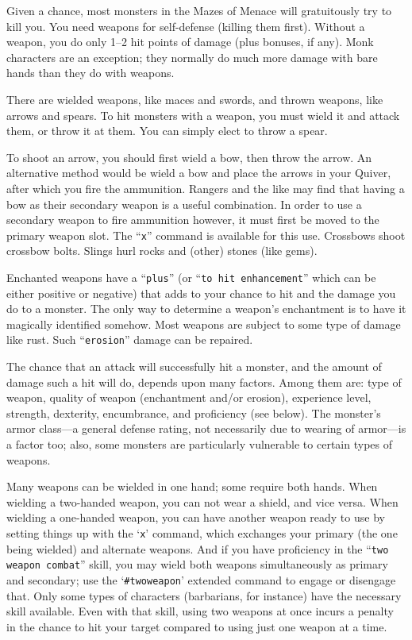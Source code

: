 
Given a chance, most monsters in the Mazes of Menace will gratuitously try to
kill you.  You need weapons for self-defense (killing them first).  Without a
weapon, you do only 1--2 hit points of damage (plus bonuses, if any).
Monk characters are an exception; they normally do much more damage with
bare hands than they do with weapons.

There are wielded weapons, like maces and swords, and thrown weapons,
like arrows and spears.  To hit monsters with a weapon, you must wield it and
attack them, or throw it at them.  You can simply elect to throw a spear.

To shoot an arrow, you should first wield a bow, then throw the arrow.
An alternative method would be wield a bow and place the arrows in your
Quiver, after which you fire the ammunition.
Rangers and the like may find that having a bow as their secondary weapon
is a useful combination. In order to use a secondary weapon to fire ammunition
however, it must first be moved to the primary weapon slot. The ``{\tt x}'' command
is available for this use.
Crossbows shoot crossbow bolts.  Slings hurl rocks and (other) stones
(like gems).

Enchanted weapons have a ``{\tt plus}'' (or ``{\tt to hit enhancement}'' which can be
either positive or negative) that adds to your chance to
hit and the damage you do to a monster.  The only way to determine a weapon's
enchantment is to have it magically identified somehow.
Most weapons are subject to some type of damage like rust.  Such
``{\tt erosion}'' damage can be repaired.

The chance that an attack will successfully hit a monster, and the amount
of damage such a hit will do, depends upon many factors.  Among them are:
type of weapon, quality of weapon (enchantment and/or erosion), experience
level, strength, dexterity, encumbrance, and proficiency (see below).  The
monster's armor class---a general defense rating, not necessarily due to
wearing of armor---is a factor too; also, some monsters are particularly
vulnerable to certain types of weapons.

Many weapons can be wielded in one hand; some require both hands.
When wielding a two-handed weapon, you can not wear a shield, and
vice versa.  When wielding a one-handed weapon, you can have another
weapon ready to use by setting things up with the `{\tt x}' command, which
exchanges your primary (the one being wielded) and alternate weapons.
And if you have proficiency in the ``{\tt two weapon combat}'' skill, you
may wield both weapons simultaneously as primary and secondary; use the
`{\tt \#twoweapon}' extended command to engage or disengage that.  Only
some types of characters (barbarians, for instance) have the necessary
skill available.  Even with that skill, using two weapons at once incurs
a penalty in the chance to hit your target compared to using just one
weapon at a time.

